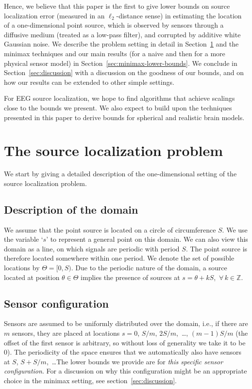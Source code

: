 \documentclass[conference]{IEEEtran}
\begin{document}
Hence, we believe that this paper is the first to give lower bounds on source
localization error (measured in an $\ell_2$-distance sense) in estimating the
location of a one-dimensional point source, which is observed by sensors
through a diffusive medium (treated as a low-pass filter), and corrupted by
additive white Gaussian noise. We describe the problem setting in detail in
Section~\ref{sec:source-localization} and the minimax techniques and our main
results (for a naive and then for a more physical sensor model) in
Section~\ref{sec:minimax-lower-bounds}. We conclude in
Section~\ref{sec:discussion} with a discussion on the goodness of our bounds,
and on how our results can be extended to other simple settings.

For EEG source localization, we hope to find algorithms that achieve scalings
close to the bounds we present.  We also expect to build upon the techniques
presented in this paper to derive bounds for spherical and realistic brain
models.

\section{The source localization problem}
\label{sec:source-localization}

We start by giving a detailed description of the one-dimensional setting of the
source localization problem.

\subsection{Description of the domain}

We assume that the point source is located on a circle of circumference $S$. We
use the variable `$s$' to represent a general point on this domain. We can also
view this domain as a line, on which signals are periodic with period $S$.  The
point source is therefore located somewhere within one period. We denote the
set of possible locations by $\Theta = [0, S)$. Due to the periodic nature of
the domain, a source located at position $\theta \in \Theta$ implies the
presence of sources at $s = \theta + kS$,~$\forall \, k \in \mathbb Z$.

\subsection{Sensor configuration}

Sensors are assumed to be uniformly distributed over the domain, i.e., if there
are $m$ sensors, they are placed at locations $s = 0$, $S/m$, $2S/m$,~\dots,
$(m{-}1)S/m$ (the offset of the first sensor is arbitrary, so without loss of
generality we take it to be 0). The periodicity of the space ensures that we
automatically also have sensors at $S$, $S{+}S/m$,~\dots\@ The lower bounds we
provide are for \emph{this specific sensor configuration}. For a discussion on
why this configuration might be an appropriate choice in the minimax setting,
see section~\ref{sec:discussion}.
\end{document}
